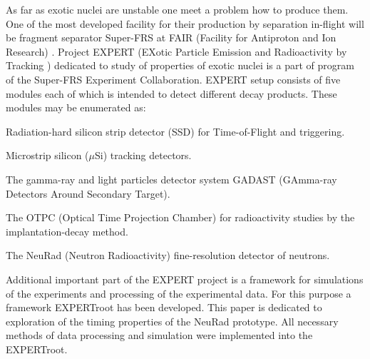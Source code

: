 \documentclass{webofc}
\begin{document}
As far as exotic nuclei are unstable one meet a problem how to produce them.
One of the most developed facility for their production by separation in-flight will be fragment separator Super-FRS at FAIR (Facility for Antiproton and Ion Research) \cite{diplom}. Project EXPERT (EXotic Particle Emission and Radioactivity by Tracking \cite{IMexpert}) dedicated to study of properties of exotic nuclei is a part of program of the Super-FRS Experiment Collaboration. EXPERT setup consists of five modules each of which is intended to detect different decay products.
These modules may be enumerated as:
\begin{inparaenum}[(i)]
	\item Radiation-hard silicon strip detector (SSD) for Time-of-Flight and triggering.
	\item Microstrip silicon ($\mu$Si) tracking detectors.
	\item The gamma-ray and light particles detector system GADAST (GAmma-ray Detectors Around Secondary Target).
	\item The OTPC (Optical Time Projection Chamber) for radioactivity studies by the implantation-decay method.
	\item The NeuRad (Neutron Radioactivity) fine-resolution detector of neutrons.
\end{inparaenum}

Additional important part of the EXPERT project is a framework for simulations of the experiments and processing of the experimental data. For this purpose a framework EXPERTroot \cite{er} has been developed.
This paper is dedicated to exploration of the timing properties of the NeuRad prototype.
All necessary methods of data processing and simulation were implemented into the EXPERTroot.
\end{document}
